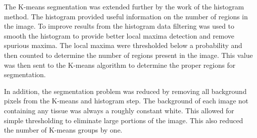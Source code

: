 \documentclass[letterpaper,10pt,oneside]{article}
\begin{document}
The K-means segmentation was extended further by the work of the histogram method. The histogram provided useful information on the number of regions in the image. To improve results from the histogram data filtering was used to smooth the histogram to provide better local maxima detection and remove spurious maxima. The local maxima were thresholded below a probability and then counted to determine the number of regions present in the image. This value was then sent to the K-means algorithm to determine the proper regions for segmentation.

In addition, the segmentation problem was reduced by removing all background pixels from the K-means and histogram step. The background of each image not containing any tissue was always a roughly constant white. This allowed for simple thresholding to eliminate large portions of the image. This also reduced the number of K-means groups by one.



\end{document}
